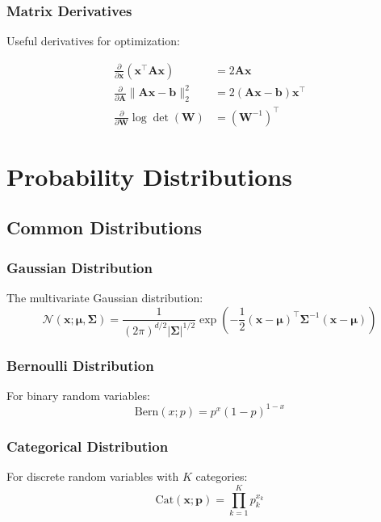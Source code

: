 \documentclass{article}
\begin{document}
\subsubsection{Matrix Derivatives}

Useful derivatives for optimization:

\begin{align*}
\frac{\partial}{\partial \mathbf{x}} (\mathbf{x}^\top \mathbf{A} \mathbf{x}) &= 2\mathbf{A} \mathbf{x} \\
\frac{\partial}{\partial \mathbf{A}} \|\mathbf{A} \mathbf{x} - \mathbf{b}\|_2^2 &= 2(\mathbf{A} \mathbf{x} - \mathbf{b}) \mathbf{x}^\top \\
\frac{\partial}{\partial \mathbf{W}} \log \det(\mathbf{W}) &= (\mathbf{W}^{-1})^\top
\end{align*}

\section{Probability Distributions}

\subsection{Common Distributions}

\subsubsection{Gaussian Distribution}

The multivariate Gaussian distribution:
\[
\mathcal{N}(\mathbf{x}; \boldsymbol{\mu}, \boldsymbol{\Sigma}) =
\frac{1}{(2\pi)^{d/2} |\boldsymbol{\Sigma}|^{1/2}}
\exp\left( -\frac{1}{2} (\mathbf{x} - \boldsymbol{\mu})^\top \boldsymbol{\Sigma}^{-1} (\mathbf{x} - \boldsymbol{\mu}) \right)
\]

\subsubsection{Bernoulli Distribution}

For binary random variables:
\[
\text{Bern}(x; p) = p^x (1-p)^{1-x}
\]

\subsubsection{Categorical Distribution}

For discrete random variables with $K$ categories:
\[
\text{Cat}(\mathbf{x}; \mathbf{p}) = \prod_{k=1}^K p_k^{x_k}
\]
\end{document}

